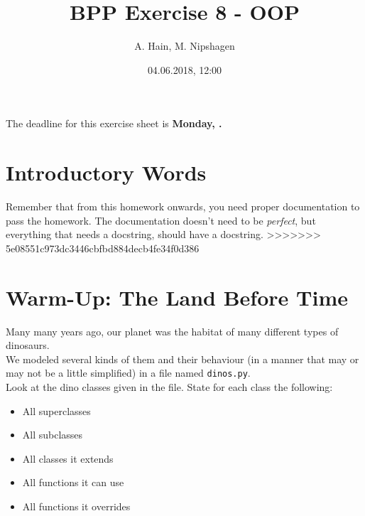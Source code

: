
\usepackage{setspace}

\title{BPP Exercise 8 - OOP}
\author{A. Hain, M. Nipshagen}
\date{04.06.2018, 12:00}

\makeatletter
\let\thetitle\@title
\let\theauthor\@author
\let\thedate\@date
\makeatother


\newcommand\itemsub[1]{
	\begin{itemize}
		\item #1
	\end{itemize}
}





The deadline for this exercise sheet is \textbf{Monday, \thedate.}

\section*{Introductory Words}
Remember that from this homework onwards, you need proper documentation to pass
the homework. The documentation doesn't need to be \textit{perfect}, but
everything that needs a docstring, should have a docstring.
>>>>>>> 5e08551c973dc3446cbfbd884decb4fe34f0d386


\section{Warm-Up: The Land Before Time}
Many many years ago, our planet was the habitat of many different types of dinosaurs.\\
We modeled several kinds of them and their behaviour (in a manner that may or may
not be a little simplified) in a file named \texttt{dinos.py}.\\
Look at the dino classes given in the file. State for each class the following:
\begin{itemize}
	\item{All superclasses}
	\item{All subclasses}
	\item{All classes it extends}
	\item{All functions it can use}
	\item{All functions it overrides}
\end{itemize}

